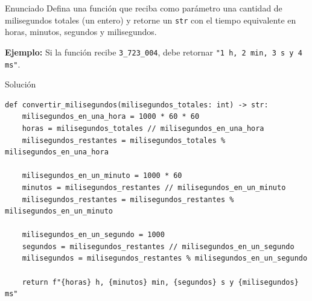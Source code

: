 \documentclass{ip-quiz}
\begin{document}
\makeheader
\maketitle

\begin{sectionbox}{Enunciado}
Defina una función que reciba como parámetro una cantidad de milisegundos totales (un entero) y retorne un \texttt{str} con el tiempo equivalente en horas, minutos, segundos y milisegundos.

\textbf{Ejemplo:} Si la función recibe \texttt{3\_723\_004}, debe retornar \texttt{"1 h, 2 min, 3 s y 4 ms"}.
\end{sectionbox}

\begin{sectionbox}{Solución}
\begin{verbatim}
def convertir_milisegundos(milisegundos_totales: int) -> str:
    milisegundos_en_una_hora = 1000 * 60 * 60
    horas = milisegundos_totales // milisegundos_en_una_hora
    milisegundos_restantes = milisegundos_totales % milisegundos_en_una_hora

    milisegundos_en_un_minuto = 1000 * 60
    minutos = milisegundos_restantes // milisegundos_en_un_minuto
    milisegundos_restantes = milisegundos_restantes % milisegundos_en_un_minuto

    milisegundos_en_un_segundo = 1000
    segundos = milisegundos_restantes // milisegundos_en_un_segundo
    milisegundos = milisegundos_restantes % milisegundos_en_un_segundo

    return f"{horas} h, {minutos} min, {segundos} s y {milisegundos} ms"
\end{verbatim}
\end{sectionbox}
\end{document}
